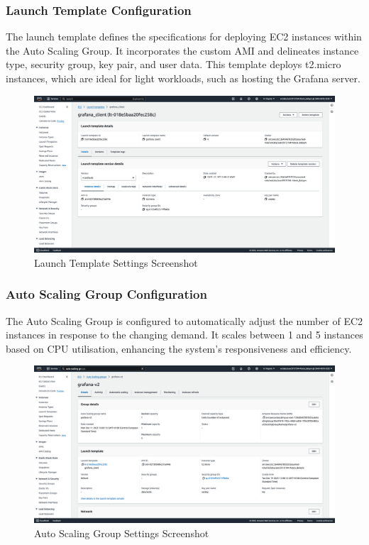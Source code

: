 \documentclass[12pt,oneside]{book} %
\begin{document}
\newpage
\subsubsection{Launch Template Configuration}
The launch template defines the specifications for deploying EC2 instances
within the Auto Scaling Group. It incorporates the custom AMI and delineates
instance type, security group, key pair, and user data. This template deploys
t2.micro instances, which are ideal for light workloads, such as hosting the
Grafana server.
\begin{figure}[H]
    \centering
    \includegraphics[width=1\linewidth]{images/launch-template.png}
    \caption{Launch Template Settings Screenshot}\label{fig:launch-template-settings}
\end{figure}

\newpage
\subsubsection{Auto Scaling Group Configuration}
The Auto Scaling Group is configured to automatically adjust the number of EC2
instances in response to the changing demand. It scales between 1 and 5
instances based on CPU utilisation, enhancing the system's responsiveness and
efficiency.
\begin{figure}[H]
    \centering
    \includegraphics[width=1\linewidth]{images/auto-scaling-group.png}
    \caption{Auto Scaling Group Settings Screenshot}\label{fig:auto-scaling-group-settings}
\end{figure}
\end{document}

